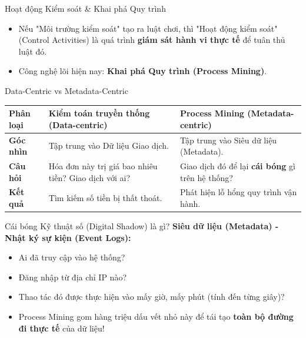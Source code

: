 \documentclass[aspectratio=169]{beamer}
\begin{document}
\begin{frame}{Hoạt động Kiểm soát \& Khai phá Quy trình}
    \begin{itemize}
        \item Nếu "Môi trường kiểm soát" tạo ra luật chơi, thì "Hoạt động kiểm soát" (Control Activities) là quá trình \textbf{giám sát hành vi thực tế} để tuân thủ luật đó.
        \item Công nghệ lõi hiện nay: \textbf{Khai phá Quy trình (Process Mining)}.
    \end{itemize}
\end{frame}

\begin{frame}{Data-Centric vs Metadata-Centric}
    \begin{table}[]
        \centering
        \begin{tabularx}{\textwidth}{|l|X|X|}
        \hline
        \textbf{Phân loại} & \textbf{Kiểm toán truyền thống (Data-centric)} & \textbf{Process Mining (Metadata-centric)} \\ \hline
        \textbf{Góc nhìn} & Tập trung vào Dữ liệu Giao dịch. & Tập trung vào Siêu dữ liệu (Metadata). \\ \hline
        \textbf{Câu hỏi} & Hóa đơn này trị giá bao nhiêu tiền? Giao dịch với ai? & Giao dịch đó để lại \textbf{cái bóng} gì trên hệ thống? \\ \hline
        \textbf{Kết quả} & Tìm kiếm số tiền bị thất thoát. & Phát hiện lỗ hổng quy trình vận hành. \\ \hline
        \end{tabularx}
    \end{table}
\end{frame}

\begin{frame}{Cái bóng Kỹ thuật số (Digital Shadow) là gì?}
    \textbf{Siêu dữ liệu (Metadata) - Nhật ký sự kiện (Event Logs):}
    \begin{itemize}
        \item Ai đã truy cập vào hệ thống?
        \item Đăng nhập từ địa chỉ IP nào?
        \item Thao tác đó được thực hiện vào mấy giờ, mấy phút (tính đến từng giây)?
        \item Process Mining gom hàng triệu dấu vết nhỏ này để tái tạo \textbf{toàn bộ đường đi thực tế} của dữ liệu!
    \end{itemize}
\end{frame}
\end{document}
